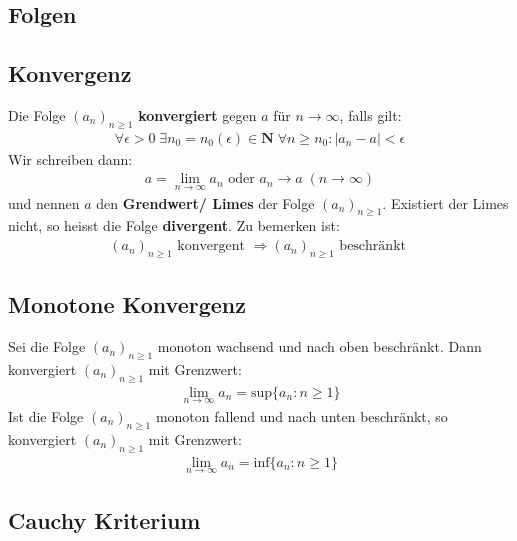 \documentclass[8pt]{article}
\begin{document}
\setlength{\columnseprule}{0.4pt}
\begin{multicols*}{3}

\section{Folgen}
\hypertarget{sec:0}{}


  \subsection {Konvergenz}

Die Folge $(a_n)_{n \geq 1}$ \textbf{konvergiert} gegen $a$ für
$n \rightarrow \infty$, falls gilt:
\begin{align*}
  \forall \epsilon > 0 \; \exists n_0 = n_0(\epsilon) \in \mathbf{N} \; \forall n \geq n_0 : |a_n - a| < \epsilon
\end{align*}
Wir schreiben dann:
\begin{align*}
  a = \lim_{n \rightarrow \infty} a_n \text{ oder }a_n \rightarrow a \; (n \rightarrow \infty)
\end{align*}
und nennen $a$ den \textbf{Grendwert/ Limes} der Folge $(a_n)_{n \geq 1}$.
Existiert der Limes nicht, so heisst die Folge \textbf{divergent}. Zu bemerken ist:
\begin{align*}
  (a_n)_{n \geq 1} \text{ konvergent } \Rightarrow (a_n)_{n \geq 1} \text{ beschränkt }
\end{align*}
  \subsection{Monotone Konvergenz}
Sei die Folge $(a_n)_{n \geq 1}$ monoton wachsend und nach oben beschränkt.
Dann konvergiert $(a_n)_{n \geq 1}$ mit Grenzwert:
\begin{align*}
  \lim_{n \rightarrow \infty} a_n = \text{sup} \{a_n : n \geq 1\}
\end{align*}
Ist die Folge $(a_n)_{n \geq 1}$ monoton fallend und nach unten beschränkt,
so konvergiert $(a_n)_{n \geq 1}$ mit Grenzwert:
\begin{align*}
  \lim_{n \rightarrow \infty} a_n = \text{inf} \{a_n : n \geq 1\}
\end{align*}
\subsection{Cauchy Kriterium}


\end{multicols*}
\end{document}
